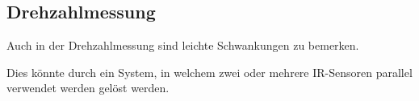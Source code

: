 \subsection{Drehzahlmessung}
\label{drehzahlmessung}

Auch in der Drehzahlmessung sind leichte Schwankungen zu bemerken.

Dies könnte durch ein System, in welchem zwei oder mehrere IR-Sensoren parallel verwendet werden gelöst werden.
